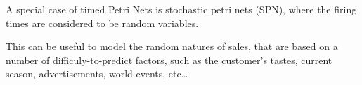 \documentclass[openright, twoside, twocolumn]{report}
\begin{document}
  A special case of timed Petri Nets is stochastic petri nets (SPN), where the firing times are
  considered to be random variables.

  This can be useful to model the random natures of sales, that are based on a number of
  difficuly-to-predict factors, such as the customer's tastes, current season, advertisements,
  world events, etc\dots

%
%
%
%
%
%
%
%
%
%
%
\end{document}
